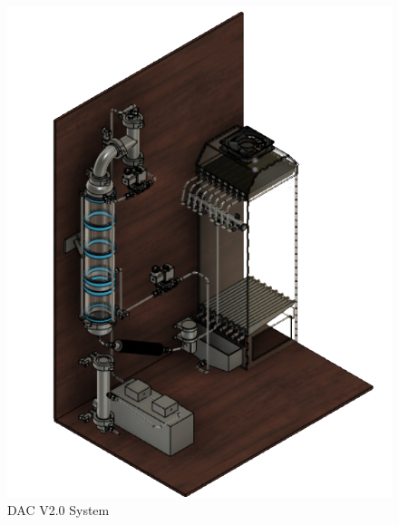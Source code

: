 \begin{appendices}
\begin{figure}[H]
    \centering
    \includegraphics[scale = 1.4]{images/mywork/Sprint4/DACV2system1.png}
    \caption{DAC V2.0 System}
    \label{fig:dacv2system}
\end{figure}





\end{appendices}
